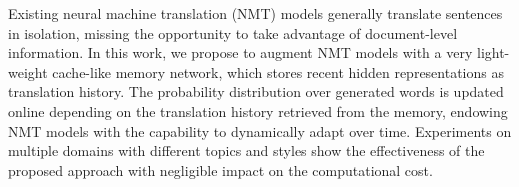 Existing neural machine translation (NMT) models generally translate sentences in isolation, missing the opportunity to take advantage of document-level information. In this work, we propose to augment NMT models with a very light-weight cache-like memory network, which stores recent hidden representations as translation history. The probability distribution over generated words is updated online depending on the translation history retrieved from the memory, endowing NMT models with the capability to dynamically adapt over time. Experiments on multiple domains with different topics and styles show the effectiveness of the proposed approach with negligible impact on the computational cost.